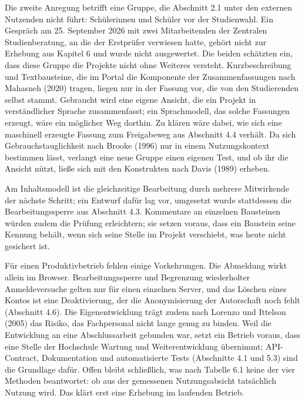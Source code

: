 Die zweite Anregung betrifft eine Gruppe, die Abschnitt 2.1 unter den externen Nutzenden nicht führt: Schülerinnen und Schüler vor der Studienwahl. Ein Gespräch am 25. September 2026 mit zwei Mitarbeitenden der Zentralen Studienberatung, an die der Erstprüfer verwiesen hatte, gehört nicht zur Erhebung aus Kapitel 6 und wurde nicht ausgewertet. Die beiden schätzten ein, dass diese Gruppe die Projekte nicht ohne Weiteres versteht. Kurzbeschreibung und Textbausteine, die im Portal die Komponente der Zusammenfassungen nach Mahasneh (2020) tragen, liegen nur in der Fassung vor, die von den Studierenden selbst stammt. Gebraucht wird eine eigene Ansicht, die ein Projekt in verständlicher Sprache zusammenfasst; ein Sprachmodell, das solche Fassungen erzeugt, wäre ein möglicher Weg dorthin. Zu klären wäre dabei, wie sich eine maschinell erzeugte Fassung zum Freigabeweg aus Abschnitt 4.4 verhält. Da sich Gebrauchstauglichkeit nach Brooke (1996) nur in einem Nutzungskontext bestimmen lässt, verlangt eine neue Gruppe einen eigenen Test, und ob ihr die Ansicht nützt, ließe sich mit den Konstrukten nach Davis (1989) erheben.

Am Inhaltsmodell ist die gleichzeitige Bearbeitung durch mehrere Mitwirkende der nächste Schritt; ein Entwurf dafür lag vor, umgesetzt wurde stattdessen die Bearbeitungssperre aus Abschnitt 4.3. Kommentare an einzelnen Bausteinen würden zudem die Prüfung erleichtern; sie setzen voraus, dass ein Baustein seine Kennung behält, wenn sich seine Stelle im Projekt verschiebt, was heute nicht gesichert ist.

Für einen Produktivbetrieb fehlen einige Vorkehrungen. Die Abmeldung wirkt allein im Browser. Bearbeitungssperre und Begrenzung wiederholter Anmeldeversuche gelten nur für einen einzelnen Server, und das Löschen eines Kontos ist eine Deaktivierung, der die Anonymisierung der Autorschaft noch fehlt (Abschnitt 4.6). Die Eigenentwicklung trägt zudem nach Lorenzo und Ittelson (2005) das Risiko, das Fachpersonal nicht lange genug zu binden. Weil die Entwicklung an eine Abschlussarbeit gebunden war, setzt ein Betrieb voraus, dass eine Stelle der Hochschule Wartung und Weiterentwicklung übernimmt; API-Contract, Dokumentation und automatisierte Tests (Abschnitte 4.1 und 5.3) sind die Grundlage dafür. Offen bleibt schließlich, was nach Tabelle 6.1 keine der vier Methoden beantwortet: ob aus der gemessenen Nutzungsabsicht tatsächlich Nutzung wird. Das klärt erst eine Erhebung im laufenden Betrieb.
